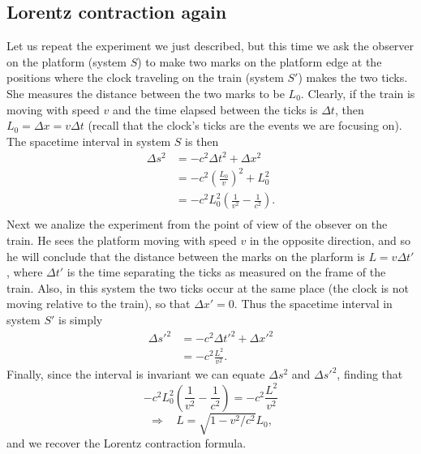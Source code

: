 \subsection{Lorentz contraction again}

Let us repeat the experiment we just described, but this time we ask the observer on the platform (system $S$) to make two marks on the platform edge at the positions where the clock traveling on the train (system $S'$) makes the two ticks. She measures the distance between the two marks to be $L_0$. Clearly, if the train is moving with speed $v$ and the time elapsed between the ticks is $\Delta t$, then $L_0=\Delta x=v\Delta t$ (recall that the clock's ticks are the events we are focusing on). The spacetime interval in system $S$ is then
\begin{equation}
\begin{split}
\Delta s^2&=-c^2\Delta t^2+\Delta x^2\\
&=-c^2\left(\frac{L_0}{v}\right)^2+L_0^2\\
&=-c^2L_0^2\left(\frac{1}{v^2}-\frac{1}{c^2}\right).\\
\end{split}
\end{equation}
Next we analize the experiment from the point of view of the obsever on the train. He sees the platform moving with speed $v$ in the opposite direction, and so he will conclude that the distance between the marks on the plarform is $L=v\Delta t'$, where $\Delta t'$ is the time separating the ticks as measured on the frame of the train. Also, in this system the two ticks occur at the same place (the clock is not moving relative to the train), so that $\Delta x'=0$. Thus the spacetime interval in system $S'$ is simply
\begin{equation}
\begin{split}
\Delta s'^2&=-c^2\Delta t'^2+\Delta x'^2\\
&=-c^2\frac{L^2}{v^2}.
\end{split}
\end{equation}
Finally, since the interval is invariant we can equate $\Delta s^2$ and $\Delta s'^2$, finding that
\begin{equation}
-c^2L_0^2\left(\frac{1}{v^2}-\frac{1}{c^2}\right)=-c^2\frac{L^2}{v^2}
\end{equation}
\begin{equation}
\Rightarrow~~~~L=\sqrt{1-v^2/c^2}L_0,
\end{equation}
and we recover the Lorentz contraction formula.

